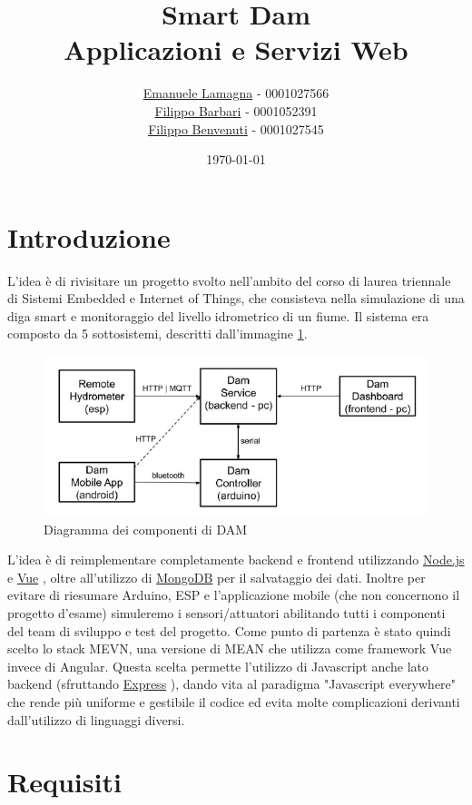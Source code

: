 \documentclass[a4paper,12pt]{report}
\title{
    Smart Dam \\
    \large Applicazioni e Servizi Web
}
\author{\href{mailto:emanuele.lamagna@studio.unibo.it}{Emanuele Lamagna} - 0001027566\\\href{mailto:filippo.barbari@studio.unibo.it}{Filippo Barbari} - 0001052391\\\href{mailto:filippo.benvenuti3@studio.unibo.it}{Filippo Benvenuti} - 0001027545}
\date{\today}
\newcommand{\node}{\href{https://nodejs.org/it/}{Node.js} }
\newcommand{\vue}{\href{https://vuejs.org/}{Vue} }
\newcommand{\express}{\href{https://expressjs.com/it/}{Express} }
\newcommand{\mongodb}{\href{https://www.mongodb.com/it-it}{MongoDB} }
\begin{document}
\maketitle
\clearpage
\tableofcontents
\clearpage

\chapter*{Introduzione}\label{sec:intro}
L'idea è di rivisitare un progetto svolto nell'ambito del corso di laurea triennale di Sistemi Embedded e Internet of Things, che consisteva nella simulazione di una diga smart e monitoraggio del livello idrometrico di un fiume. Il sistema era composto da 5 sottosistemi, descritti dall'immagine \ref{fig:dam-scheme}.
\begin{figure}[h!]
    \centering
    \includegraphics[scale=0.7]{dam-scheme.png}
    \caption{Diagramma dei componenti di DAM}
    \label{fig:dam-scheme}
\end{figure}

L'idea è di reimplementare completamente backend e frontend utilizzando \node e \vue, oltre all'utilizzo di \mongodb per il salvataggio dei dati. Inoltre per evitare di riesumare Arduino, ESP e l'applicazione mobile (che non concernono il progetto d'esame) simuleremo i sensori/attuatori abilitando tutti i componenti del team di sviluppo e test del progetto.
Come punto di partenza è stato quindi scelto lo stack MEVN, una versione di MEAN che utilizza come framework Vue invece di Angular. Questa scelta permette l'utilizzo di Javascript anche lato backend (sfruttando \express), dando vita al paradigma "Javascript everywhere" che rende più uniforme e gestibile il codice ed evita molte complicazioni derivanti dall'utilizzo di linguaggi diversi.
\clearpage

\chapter{Requisiti}\label{sec:requirements}
\end{document}
